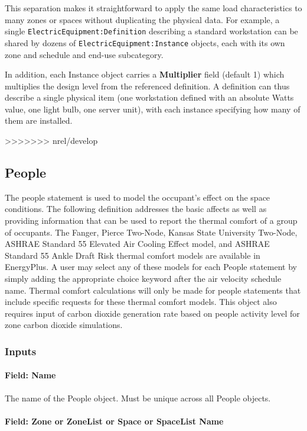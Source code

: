 This separation makes it straightforward to apply the same load characteristics to many zones or spaces without duplicating the physical data. For example, a single \texttt{ElectricEquipment:Definition} describing a standard workstation can be shared by dozens of \texttt{ElectricEquipment:Instance} objects, each with its own zone and schedule and end-use subcategory.


In addition, each Instance object carries a \textbf{Multiplier} field (default 1) which multiplies the design level from the referenced definition. A definition can thus describe a single physical item (one workstation defined with an absolute Watts value, one light bulb, one server unit), with each instance specifying how many of them are installed.

>>>>>>> nrel/develop
\subsection{People}\label{people}

The people statement is used to model the occupant's effect on the space conditions. The following definition addresses the basic affects as well as providing information that can be used to report the thermal comfort of a group of occupants. The Fanger, Pierce Two-Node, Kansas State University Two-Node, ASHRAE Standard 55 Elevated Air Cooling Effect model, and ASHRAE Standard 55 Ankle Draft Risk thermal comfort models are available in EnergyPlus. A user may select any of these models for each People statement by simply adding the appropriate choice keyword after the air velocity schedule name. Thermal comfort calculations will only be made for people statements that include specific requests for these thermal comfort models. This object also requires input of carbon dioxide generation rate based on people activity level for zone carbon dioxide simulations.

\subsubsection{Inputs}\label{inputs-025}

\paragraph{Field: Name}\label{field-name-024}

The name of the People object. Must be unique across all People objects.

\paragraph{Field: Zone or ZoneList or Space or SpaceList Name}\label{field-zone-or-zonelist-name-000}


